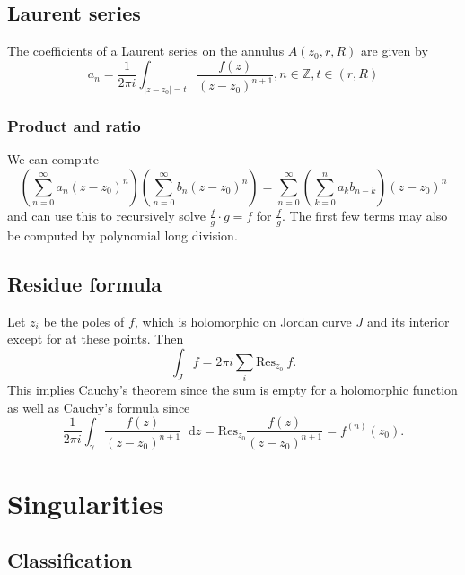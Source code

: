 \documentclass{article}
\newcommand\dif{\mathop{}\!\mathrm{d}}
\newcommand{\Res}{\mathrm{Res}}
\begin{document}
\subsection{Laurent series}

The coefficients of a Laurent series on the annulus $A(z_0, r, R)$
are given by
$$
  a_n
= \frac{1}{2 \pi i}
  \int_{|z - z_0| = t}
    \frac{f(z)}{(z - z_0)^{n+1}},
n \in \mathbb{Z},
t \in (r, R)
$$

\subsubsection{Product and ratio}
We can compute
$$
  \left(
    \sum_{n=0}^\infty
      a_n
      (z - z_0)^n
  \right)
  \left(
    \sum_{n=0}^\infty
      b_n
      (z - z_0)^n
  \right)
= \sum_{n=0}^\infty
    \left(
      \sum_{k=0}^n
        a_k
        b_{n-k}
    \right)
    (z - z_0)^n
$$
and can use this to recursively solve $\frac{f}{g} \cdot g = f$ for
$\frac{f}{g}$. The first few terms may also be computed by polynomial
long division.

\subsection{Residue formula}
Let $z_i$ be the poles of $f$, which is holomorphic on
Jordan curve $J$ and its interior except for
at these points. Then
$$
  \int_J f
= 2 \pi i
  \sum_i
  \Res_{z_0}~f.
$$
This implies Cauchy's theorem since the sum is empty for a holomorphic
function as well as Cauchy's formula since
$$
  \frac{1}{2 \pi i}
  \int_\gamma
    \frac{f(z)}
         {(z - z_0)^{n+1}}
    \dif z
= \Res_{z_0}
    \frac{f(z)}{(z - z_0)^{n+1}}
= f^{(n)}(z_0).
$$

\section{Singularities}

\subsection{Classification}
\end{document}
